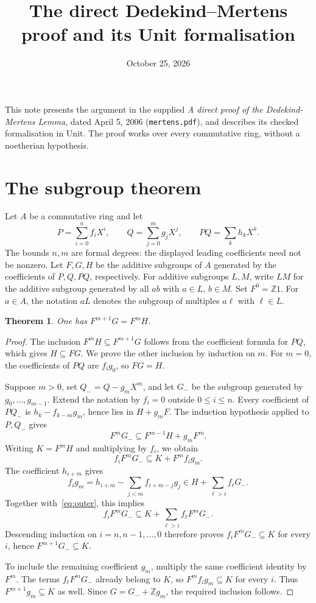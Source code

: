 \documentclass[11pt]{amsart}
\title{The direct Dedekind--Mertens proof and its Unit formalisation}
\date{October 25, 2026}
\newtheorem{theorem}{Theorem}
\newcommand{\code}[1]{\texttt{#1}}
\begin{document}
\maketitle

This note presents the argument in the supplied \emph{A direct proof of
the Dedekind-Mertens Lemma}, dated April 5, 2006
(\code{mertens.pdf}), and describes its checked formalisation in Unit.
The proof works over every commutative ring, without a noetherian
hypothesis.

\section{The subgroup theorem}

Let $A$ be a commutative ring and let
\[
 P=\sum_{i=0}^n f_iX^i,\qquad
 Q=\sum_{j=0}^m g_jX^j,\qquad
 PQ=\sum_k h_kX^k.
\]
The bounds $n,m$ are formal degrees: the displayed leading coefficients
need not be nonzero. Let $F,G,H$ be the additive subgroups of $A$
generated by the coefficients of $P,Q,PQ$, respectively.
For additive subgroups $L,M$, write $LM$ for the additive subgroup
generated by all $ab$ with $a\in L$, $b\in M$. Set $F^0=\mathbb Z1$.
For $a\in A$, the notation $aL$ denotes the subgroup of multiples
$a\ell$ with $\ell\in L$.

\begin{theorem}\label{thm:strong}
One has $F^{m+1}G=F^mH$.
\end{theorem}
\begin{proof}
The inclusion $F^mH\subseteq F^{m+1}G$ follows from the coefficient
formula for $PQ$, which gives $H\subseteq FG$.
We prove the other inclusion by induction on $m$.
For $m=0$, the coefficients of $PQ$ are $f_i g_0$, so $FG=H$.

Suppose $m>0$, set $Q_-=Q-g_mX^m$, and let $G_-$ be the subgroup
generated by $g_0,\ldots,g_{m-1}$. Extend the notation by $f_i=0$
outside $0\leq i\leq n$. Every coefficient of $PQ_-$ is
$h_k-f_{k-m}g_m$, hence lies in $H+g_mF$. The induction hypothesis
applied to $P,Q_-$ gives
\[
 F^mG_-\subseteq F^{m-1}H+g_mF^m.
\]
Writing $K=F^mH$ and multiplying by $f_i$, we obtain
\begin{equation}\label{eq:outer}
 f_iF^mG_-\subseteq K+F^m f_i g_m.
\end{equation}
The coefficient $h_{i+m}$ gives
\[
 f_i g_m
 =h_{i+m}-\sum_{j<m} f_{i+m-j}g_j
 \in H+\sum_{\ell>i}f_\ell G_-.
\]
Together with~\eqref{eq:outer}, this implies
\[
 f_iF^mG_-\subseteq K+\sum_{\ell>i}f_\ell F^mG_-.
\]
Descending induction on $i=n,n-1,\ldots,0$ therefore proves
$f_iF^mG_-\subseteq K$ for every $i$, hence
$F^{m+1}G_-\subseteq K$.

To include the remaining coefficient $g_m$, multiply the same
coefficient identity by $F^m$. The terms
$f_\ell F^mG_-$ already belong to $K$, so
$F^m f_i g_m\subseteq K$ for every $i$. Thus
$F^{m+1}g_m\subseteq K$ as well. Since
$G=G_-+\mathbb Zg_m$, the required inclusion follows.
\end{proof}
\end{document}
